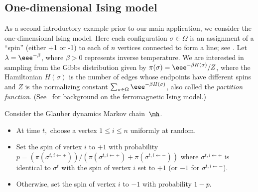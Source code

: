 \documentclass{toc}
\begin{document}
\subsection{One-dimensional Ising model}\label{sec:1DIsing}

As a second introductory example prior to our main application, we 
consider the one-dimensional Ising model.  Here each configuration 
$\sigma \in \Omega$ is an assignment of a ``spin'' (either +1 or -1) to 
each of $n$ vertices connected to form a line; see 
.  Let $\lambda = \eee^{-\beta}$, where $\beta > 0$ 
represents inverse temperature.  We are interested in sampling from the 
Gibbs distribution given by $\pi(\sigma) = \eee^{-\beta H(\sigma)}/Z$, 
where the Hamiltonian $H(\sigma)$ is the number of edges whose 
endpoints have different spins and $Z$ is the normalizing constant 
$\sum_{\sigma \in \Omega} \eee^{-\beta H(\sigma)}$, also called the 
\emph{partition function}. (See~\cite{LPW06} for background on the 
ferromagnetic Ising model.) 

Consider the Glauber dynamics Markov chain~$\mh$.   

\vspace{.1in}

\vspace{.05in}
\begin{itemize}
\item At time $t,$ choose a vertex $1\leq i \leq n$ uniformly at random.  
\item Set the spin of vertex $i$ to $+1$ with probability $p = (\pi(\sigma^{t, i \leftarrow +}))/(\pi(\sigma^{t, i \leftarrow +})+ \pi(\sigma^{t, i \leftarrow -}))$ where $\sigma^{t, i \leftarrow +}$ is identical to $\sigma^t$ with the spin of vertex $i$ set to $+1$ (or $-1$ for $\sigma^{t, i \leftarrow -}$).
\item Otherwise, set the spin of vertex $i$ to $-1$ with probability $1-p.$
\end{itemize}
\end{document}
